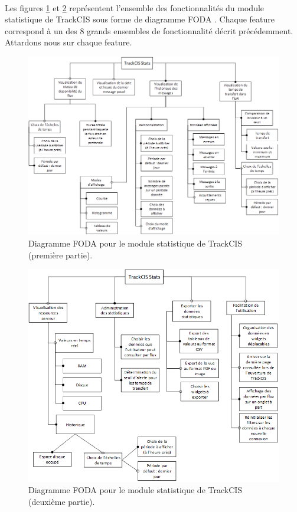 			\paragraph{}
			Les figures \ref{foda_1} et \ref{foda_2} représentent l'ensemble des
			fonctionnalités du module statistique de TrackCIS sous forme de diagramme
			FODA . Chaque feature correspond à un des 8 grands
			ensembles de fonctionnalité décrit précédemment. Attardons nous sur chaque
			feature. \begin{figure}[h]%
				\centering
				\includegraphics[width=17cm]{../img/part2/foda_1.png}
				\caption{\label{foda_1} Diagramme FODA pour le module statistique de
				TrackCIS (première partie).}
			\end{figure}
			\begin{figure}[h]%
				\centering
				\includegraphics[width=17cm]{../img/part2/foda_2.png}
				\caption{\label{foda_2} Diagramme FODA pour le module statistique de
				TrackCIS (deuxième partie).}
			\end{figure}
			
